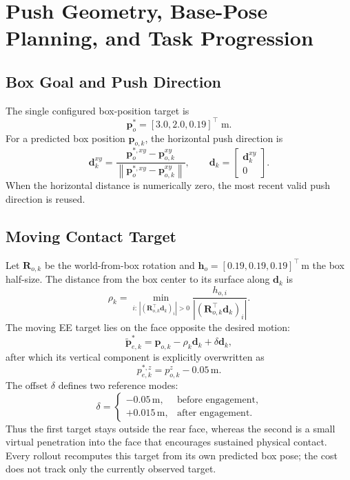\documentclass[11pt,a4paper]{article}
\newcommand{\norm}[1]{\left\lVert #1 \right\rVert}
\begin{document}
\section{Push Geometry, Base-Pose Planning, and Task Progression}

\subsection{Box Goal and Push Direction}

The single configured box-position target is
\begin{equation}
  \bm{p}_o^*=[3.0,2.0,0.19]^\top\;\mathrm{m}.
\end{equation}
For a predicted box position $\bm{p}_{o,k}$, the horizontal push direction is
\begin{equation}
  \bm{d}_k^{xy}
  =
  \frac{\bm{p}_o^{*,xy}-\bm{p}_{o,k}^{xy}}
       {\norm{\bm{p}_o^{*,xy}-\bm{p}_{o,k}^{xy}}},
  \qquad
  \bm{d}_k=
  \begin{bmatrix}\bm{d}_k^{xy}\\0\end{bmatrix}.
\end{equation}
When the horizontal distance is numerically zero, the most recent valid push
direction is reused.

\subsection{Moving Contact Target}

Let $\bm{R}_{o,k}$ be the world-from-box rotation and
$\bm{h}_o=[0.19,0.19,0.19]^\top\,\mathrm{m}$ the box half-size. The distance
from the box center to its surface along $\bm{d}_k$ is
\begin{equation}
  \rho_k
  =\min_{i:\,|(\bm{R}_{o,k}^\top\bm{d}_k)_i|>0}
  \frac{h_{o,i}}{|(\bm{R}_{o,k}^\top\bm{d}_k)_i|}.
\end{equation}
The moving EE target lies on the face opposite the desired motion:
\begin{equation}
  \tilde{\bm{p}}_{e,k}^*
  =\bm{p}_{o,k}-\rho_k\bm{d}_k+\delta\bm{d}_k,
\end{equation}
after which its vertical component is explicitly overwritten as
\begin{equation}
  p_{e,k}^{*,z}=p_{o,k}^{z}-0.05\,\mathrm{m}.
\end{equation}
The offset $\delta$ defines two reference modes:
\begin{equation}
  \delta=
  \begin{cases}
    -0.05\,\mathrm{m},&\text{before engagement},\\
    +0.015\,\mathrm{m},&\text{after engagement}.
  \end{cases}
\end{equation}
Thus the first target stays outside the rear face, whereas the second is a
small virtual penetration into the face that encourages sustained physical
contact. Every rollout recomputes this target from its own predicted box pose;
the cost does not track only the currently observed target.
\end{document}
